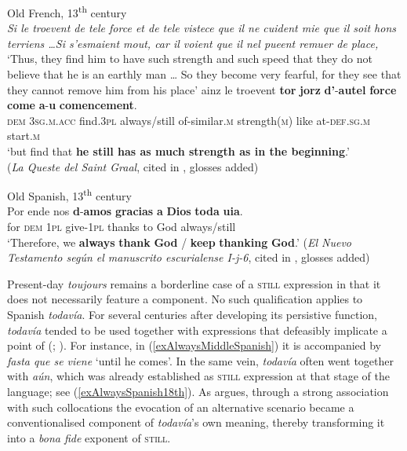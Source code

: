 \begin{exe}
\ex Old French, 13\textsuperscript{th} century\label{exAlwaysOldFrench}\\
\textit{Si le troevent de tele force et de tele vistece que il ne cuident mie que il soit hons terriens …Si s’esmaient mout, car il voient que il nel pueent remuer de place,}\\
\lq Thus, they find him to have such strength and such speed that they do not believe that he is an earthly man …  So they become very fearful, for they see that they cannot remove him from his place'
\exi{}
\gll ainz le troevent {\textbf{tor} \textbf{jorz}} \textbf{d’}-\textbf{autel} \textbf{force} \textbf{come} \textbf{a}-\textbf{u} \textbf{comencement}.\\
\textsc{dem} 3\textsc{sg}.\textsc{m}.\textsc{acc} find.3\textsc{pl} always/still of-similar.\textsc{m} strength(\textsc{m}) like at-\textsc{def}.\textsc{sg}.\textsc{m} start.\textsc{m}\\
\glt \lq but find that \textbf{he still has as much strength as in the beginning}.'
\\(\textit{La Queste del Saint Graal}, cited in \cite[149]{MosegaardHansen2008},  glosses added) 

\ex Old Spanish, 13\textsuperscript{th} century\label{exAlwaysOldSpanish1}\\
\gll Por ende nos \textbf{d}-\textbf{amos} \textbf{gracias} \textbf{a} \textbf{Dios} {\textbf{toda} \textbf{uia}}.\\
for \textsc{dem} 1\textsc{pl} give-1\textsc{pl} thanks to God always/still\\
\glt \lq Therefore, we \textbf{always} \textbf{thank} \textbf{God} / \textbf{keep} \textbf{thanking} \textbf{God}.' (\textit{El Nuevo Testamento según el manuscrito escurialense I-j-6}, cited in \cite[209]{Bosque2016},  glosses added)
\end{exe}

Present-day  \textit{toujours} remains a borderline case of a \textsc{still} expression in that it does not necessarily feature a  component. No such qualification applies to Spanish \textit{todavía}.  For several centuries after developing its persistive function, \textit{todavía} tended to be used together with expressions that defeasibly implicate a point of  (\cite{Bosque2016}; \cite{Morera1999}). For instance, in (\ref{exAlwaysMiddleSpanish}) it is accompanied by \textit{fasta que se viene} \lq until he comes'. In the same vein, \textit{todavía} often went together with \textit{aún}, which was already established as \textsc{still} expression at that stage of the language; see (\ref{exAlwaysSpanish18th}). As \textcite{Bosque2016} argues, through a strong association with such collocations the evocation of an alternative scenario became a conventionalised component of \textit{todavía}'s own meaning, thereby transforming it into a \textit{bona fide} exponent of \textsc{still}. 

